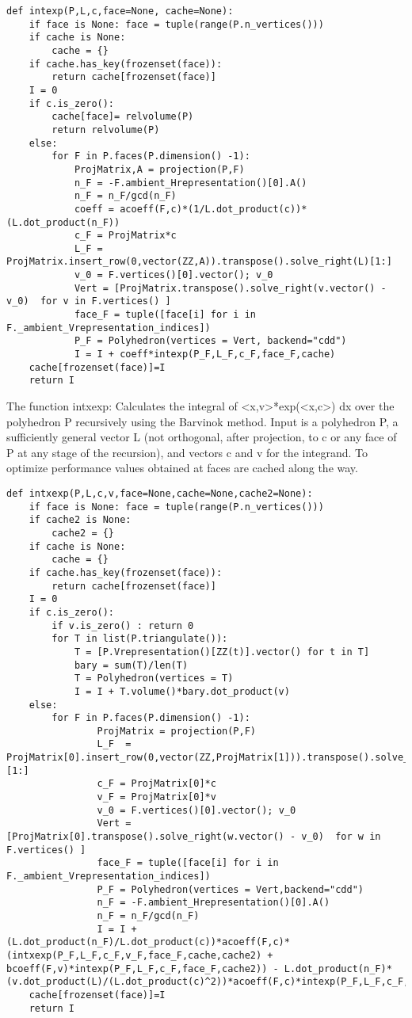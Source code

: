 \begin{lstlisting}
def intexp(P,L,c,face=None, cache=None):
    if face is None: face = tuple(range(P.n_vertices()))
    if cache is None:
        cache = {}
    if cache.has_key(frozenset(face)):
        return cache[frozenset(face)]
    I = 0
    if c.is_zero():
        cache[face]= relvolume(P)
        return relvolume(P)
    else:
        for F in P.faces(P.dimension() -1):
            ProjMatrix,A = projection(P,F)
            n_F = -F.ambient_Hrepresentation()[0].A()
            n_F = n_F/gcd(n_F)
            coeff = acoeff(F,c)*(1/L.dot_product(c))*(L.dot_product(n_F))
            c_F = ProjMatrix*c
            L_F = ProjMatrix.insert_row(0,vector(ZZ,A)).transpose().solve_right(L)[1:]
            v_0 = F.vertices()[0].vector(); v_0
            Vert = [ProjMatrix.transpose().solve_right(v.vector() - v_0)  for v in F.vertices() ]
            face_F = tuple([face[i] for i in F._ambient_Vrepresentation_indices])
            P_F = Polyhedron(vertices = Vert, backend="cdd")
            I = I + coeff*intexp(P_F,L_F,c_F,face_F,cache)
    cache[frozenset(face)]=I
    return I
\end{lstlisting}

The function intxexp:
Calculates the integral of <x,v>*exp(<x,c>) dx over the polyhedron P recursively using the Barvinok method. Input is a polyhedron P,
a sufficiently general vector L (not orthogonal, after projection, to c or any face of P at any stage of the recursion),
and vectors c and v for the integrand. To optimize performance values obtained at faces are cached along the way.

\begin{lstlisting}
def intxexp(P,L,c,v,face=None,cache=None,cache2=None):
    if face is None: face = tuple(range(P.n_vertices()))
    if cache2 is None:
        cache2 = {}
    if cache is None:
        cache = {}
    if cache.has_key(frozenset(face)):
        return cache[frozenset(face)] 
    I = 0
    if c.is_zero():
        if v.is_zero() : return 0
        for T in list(P.triangulate()):
            T = [P.Vrepresentation()[ZZ(t)].vector() for t in T]
            bary = sum(T)/len(T)
            T = Polyhedron(vertices = T)
            I = I + T.volume()*bary.dot_product(v)
    else:
        for F in P.faces(P.dimension() -1):
                ProjMatrix = projection(P,F)
                L_F  = ProjMatrix[0].insert_row(0,vector(ZZ,ProjMatrix[1])).transpose().solve_right(L)[1:]
                c_F = ProjMatrix[0]*c
                v_F = ProjMatrix[0]*v
                v_0 = F.vertices()[0].vector(); v_0
                Vert = [ProjMatrix[0].transpose().solve_right(w.vector() - v_0)  for w in F.vertices() ]
                face_F = tuple([face[i] for i in F._ambient_Vrepresentation_indices])
                P_F = Polyhedron(vertices = Vert,backend="cdd")
                n_F = -F.ambient_Hrepresentation()[0].A()
                n_F = n_F/gcd(n_F)
                I = I + (L.dot_product(n_F)/L.dot_product(c))*acoeff(F,c)*(intxexp(P_F,L_F,c_F,v_F,face_F,cache,cache2) + bcoeff(F,v)*intexp(P_F,L_F,c_F,face_F,cache2)) - L.dot_product(n_F)*(v.dot_product(L)/(L.dot_product(c)^2))*acoeff(F,c)*intexp(P_F,L_F,c_F,face_F,cache2)
    cache[frozenset(face)]=I
    return I
\end{lstlisting}

